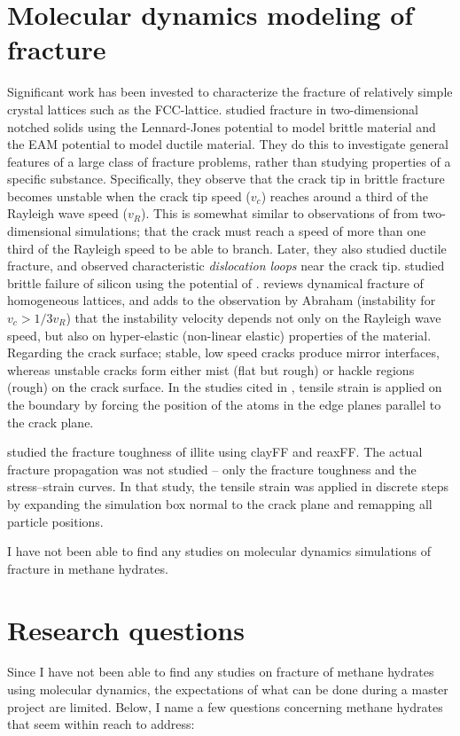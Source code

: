 \section{Molecular dynamics modeling of fracture}
Significant work has been invested to characterize the fracture of relatively simple crystal lattices such as the FCC-lattice. \citet{Abraham19971595} studied fracture in two-dimensional notched solids using the Lennard-Jones potential to model brittle material and the EAM potential \cite{PhysRevB.29.6443} to model ductile material. They do this to investigate general features of a large class of fracture problems, rather than studying properties of a specific substance. Specifically, they observe that the crack tip in brittle fracture becomes unstable when the crack tip speed ($v_c$) reaches around a third of the Rayleigh wave speed ($v_R$). This is somewhat similar to observations of \citet{PhysRevLett.76.2318} from two-dimensional simulations; that the crack must reach a speed of more than one third of the Rayleigh speed to be able to branch. Later, they also studied ductile fracture, and observed characteristic \emph{dislocation loops} near the crack tip. \citet{PhysRevLett.80.746} studied brittle failure of silicon using the potential of \citet{Stillinger1985}. \citet[ch. 6]{doi:10.1142/9789812773326_0001} reviews dynamical fracture of homogeneous lattices, and adds to the observation by Abraham (instability for $v_c > 1/3 v_R$) that the instability velocity depends not only on the Rayleigh wave speed, but also on hyper-elastic (non-linear elastic) properties of the material. Regarding the crack surface; stable, low speed cracks produce mirror interfaces, whereas unstable cracks form either mist (flat but rough) or hackle regions (rough) on the crack surface. In the studies cited in \citet[ch. 6]{doi:10.1142/9789812773326_0001}, tensile strain is applied on the boundary by forcing the position of the atoms in the edge planes parallel to the crack plane. 

\citet{Hantal2014} studied the fracture toughness of illite using clayFF and reaxFF. The actual fracture propagation was not studied -- only the fracture toughness and the stress--strain curves. In that study, the tensile strain was applied in discrete steps by expanding the simulation box normal to the crack plane and remapping all particle positions.

I have not been able to find any studies on molecular dynamics simulations of fracture in methane hydrates.


\section{Research questions}
\label{sec:research_questions}
Since I have not been able to find any studies on fracture of methane hydrates using molecular dynamics, the expectations of what can be done during a master project are limited. Below, I name a few questions concerning methane hydrates that seem within reach to address:

